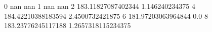 0 nan nan
1 nan nan
2 183.11827087402344 1.146240234375
4 184.42210388183594 2.4500732421875
6 181.97203063964844 0.0
8 183.23776245117188 1.2657318115234375
